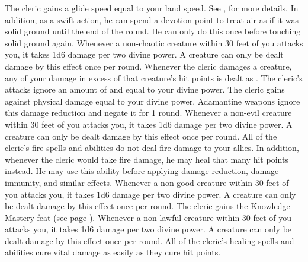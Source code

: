             The cleric gains a glide speed equal to your land speed.
            See , for more details.
            In addition, as a swift action, he can spend a devotion point to treat air as if it was solid ground until the end of the round.
            He can only do this once before touching solid ground again.
            Whenever a non-chaotic creature within 30 feet of you attacks you, it takes 1d6 damage per two divine power.
            A creature can only be dealt damage by this effect once per round.
            Whenever the cleric damages a creature, any of your damage in excess of that creature's hit points is dealt as .
            The cleric's attacks ignore an amount of  and  equal to your divine power.
            The cleric gains  against physical damage equal to your divine power.
            Adamantine weapons ignore this damage reduction and negate it for 1 round.
            Whenever a non-evil creature within 30 feet of you attacks you, it takes 1d6 damage per two divine power.
            A creature can only be dealt damage by this effect once per round.
            All of the cleric's fire spells and abilities do not deal fire damage to your allies.
            In addition, whenever the cleric would take fire damage, he may heal that many hit points instead.
            He may use this ability before applying damage reduction, damage immunity, and similar effects.
            Whenever a non-good creature within 30 feet of you attacks you, it takes 1d6 damage per two divine power.
            A creature can only be dealt damage by this effect once per round.
            The cleric gains the Knowledge Mastery feat (see page ).
            Whenever a non-lawful creature within 30 feet of you attacks you, it takes 1d6 damage per two divine power.
            A creature can only be dealt damage by this effect once per round.
            All of the cleric's healing spells and abilities cure vital damage as easily as they cure hit points.
